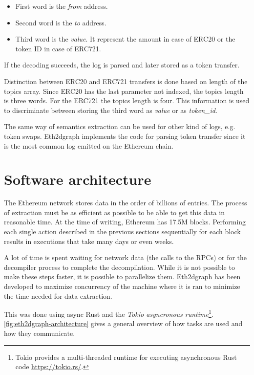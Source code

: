 \begin{itemize}
    \item First word is the \textit{from} address.
    \item Second word is the \textit{to} address.
    \item Third word is the \textit{value}. It represent the amount in case of ERC20 or the token ID in case of ERC721.
\end{itemize}

If the decoding succeeds, the log is parsed and later stored as a token transfer.

Distinction between ERC20 and ERC721 transfers is done based on length of the topics array. Since ERC20 has the last parameter not indexed, the topics length is three words. For the ERC721 the topics length is four. This information is used to discriminate between storing the third word as \textit{value} or as \textit{token\_id}.

The same way of semantics extraction can be used for other kind of logs, e.g. token swaps. Eth2dgraph implements the code for parsing token transfer since it is the most common log emitted on the Ethereum chain.

\section{Software architecture}

The Ethereum network stores data in the order of billions of entries. The process of extraction must be as efficient as possible to be able to get this data in reasonable time. At the time of writing, Ethereum has 17.5M blocks. Performing each single action described in the previous sections sequentially for each block results in executions that take many days or even weeks. 

A lot of time is spent waiting for network data (the calls to the RPCs) or for the decompiler process to complete the decompilation. While it is not possible to make these steps faster, it is possible to parallelize them. Eth2dgraph has been developed to maximize concurrency of the machine where it is ran to minimize the time needed for data extraction.

This was done using async Rust and the \textit{Tokio asyncronous runtime}\footnote{Tokio provides a multi-threaded runtime for executing asynchronous Rust code \url{https://tokio.rs/}.}. \cref{fig:eth2dgraph-architecture} gives a general overview of how tasks are used and how they communicate.


